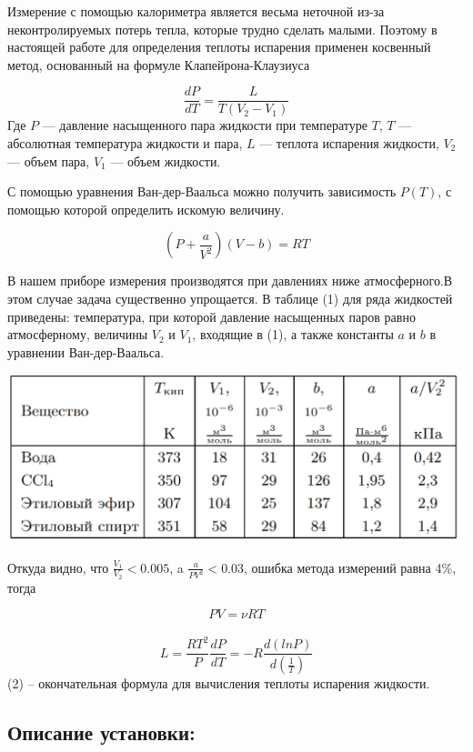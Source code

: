 \documentclass[a4paper,12pt]{article}
\begin{document}
Измерение с помощью калориметра является весьма неточной из-за неконтролируемых потерь тепла, которые трудно сделать малыми. Поэтому в настоящей работе для определения теплоты испарения применен косвенный метод, основанный на формуле Клапейрона-Клаузиуса

\begin{equation}
\frac{dP}{dT}=\frac{L}{T(V_2-V_1)}
\end{equation}
Где $P$ — давление насыщенного пара жидкости при температуре $T$, $T$ — абсолютная температура жидкости и пара, $L$ — теплота испарения жидкости, $V_2$ — объем пара, $V_1$ — объем жидкости.

С помощью уравнения Ван-дер-Ваальса можно получить зависимость $P(T)$, с помощью которой определить искомую величину. 

\begin{equation*}
(P+\frac{a}{V^2})(V-b)=RT
\end{equation*}


В нашем приборе измерения производятся при давлениях ниже
атмосферного.В этом случае задача существенно упрощается. В таблице (1) для ряда жидкостей приведены: температура, при которой давление насыщенных паров равно атмосферному, величины $V_2$ и $V_1$, входящие в (1), а также константы $a$ и $b$ в уравнении Ван-дер-Ваальса.
\begin{center}
\includegraphics[width=0.7\linewidth]{tab.png}
\end{center}

 Откуда видно, что $\frac{V_1}{V_2} < 0.005$, a $\frac{a}{PV^2}<0.03$, ошибка метода измерений равна 4\%, тогда
 
 \begin{equation*}
PV=\nu RT
\end{equation*} \\
\begin{equation}
L=\frac{ RT^2}{P}\frac{dP}{dT} = - R\frac{d(lnP)}{d(\frac{1}{T})}
\end{equation}
(2) -- окончательная формула для вычисления теплоты испарения жидкости.
\subsection{Описание установки:}
\end{document}
